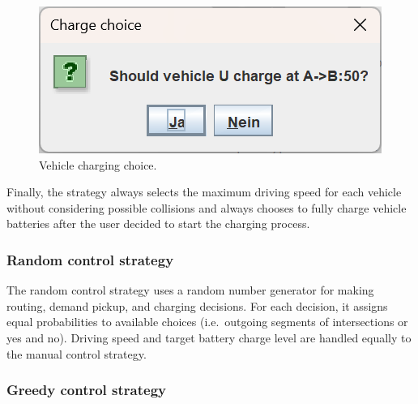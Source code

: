 \documentclass[a4paper,twoside]{article}
\begin{document}
	\begin{figure}[!ht]
		\centering
		\includegraphics[scale=0.3]{./graphics/screenshots/manual-controller-charge.png}
		\caption{Vehicle charging choice.}
		\label{fig:manual-controller-charge}
	\end{figure}

	Finally, the strategy always selects the maximum driving speed for each vehicle without considering possible collisions and always chooses to fully charge vehicle batteries after the user decided to start the charging process.
	
	\subsubsection*{Random control strategy}
	\label{sec:controller-random}
	
	The random control strategy uses a random number generator for making routing, demand pickup, and charging decisions.
	For each decision, it assigns equal probabilities to available choices (i.e.\ outgoing segments of intersections or yes and no).
	Driving speed and target battery charge level are handled equally to the manual control strategy.
	
	\subsubsection*{Greedy control strategy}
	\label{sec:controller-greedy}
	
\end{document}
